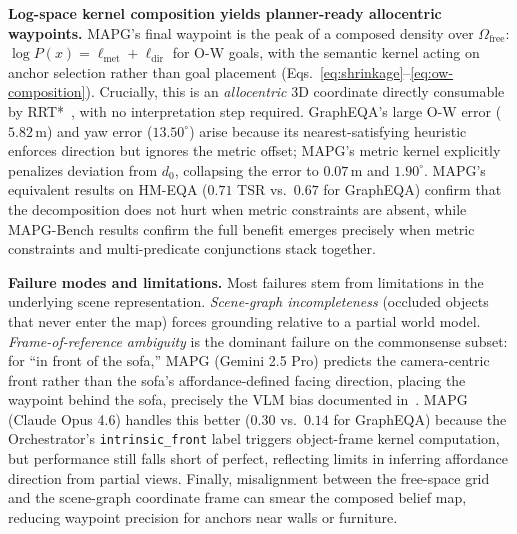 \noindent\textbf{Log-space kernel composition yields planner-ready allocentric waypoints.}
MAPG's final waypoint is the peak of a composed density over $\Omega_{\text{free}}$: $\log P(x) = \ell_{\text{met}} + \ell_{\text{dir}}$ for O-W goals, with the semantic kernel acting on anchor selection rather than goal placement (Eqs.~\ref{eq:shrinkage}--\ref{eq:ow-composition}). Crucially, this is an \emph{allocentric} $3$D coordinate directly consumable by RRT*~\cite{karaman2011sampling}, with no interpretation step required. GraphEQA's large O-W error ($5.82\,\mathrm{m}$) and yaw error ($13.50^\circ$) arise because its nearest-satisfying heuristic enforces direction but ignores the metric offset; MAPG's metric kernel explicitly penalizes deviation from $d_0$, collapsing the error to $0.07\,\mathrm{m}$ and $1.90^\circ$. MAPG's equivalent results on HM-EQA ($0.71$ TSR vs.\ $0.67$ for GraphEQA) confirm that the decomposition does not hurt when metric constraints are absent, while MAPG-Bench results confirm the full benefit emerges precisely when metric constraints and multi-predicate conjunctions stack together. 

\noindent\textbf{Failure modes and limitations.}
Most failures stem from limitations in the underlying scene representation. \emph{Scene-graph incompleteness} (occluded objects that never enter the map) forces grounding relative to a partial world model. \emph{Frame-of-reference ambiguity} is the dominant failure on the commonsense subset: for ``in front of the sofa,'' MAPG (Gemini 2.5 Pro) predicts the camera-centric front rather than the sofa's affordance-defined facing direction, placing the waypoint behind the sofa, precisely the VLM bias documented in~\cite{frameOfReferenceAmbiguity}. MAPG (Claude Opus 4.6) handles this better ($0.30$ vs.\ $0.14$ for GraphEQA) because the Orchestrator's \texttt{intrinsic\_front} label triggers object-frame kernel computation, but performance still falls short of perfect, reflecting limits in inferring affordance direction from partial views. Finally, misalignment between the free-space grid and the scene-graph coordinate frame can smear the composed belief map, reducing waypoint precision for anchors near walls or furniture.
